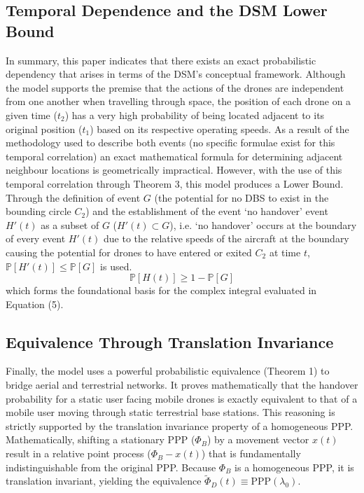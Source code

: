 \documentclass[12pt,a4paper]{article}
\begin{document}
   \subsection*{Temporal Dependence and the DSM Lower Bound} %
In summary, this paper indicates that there exists an exact probabilistic dependency that arises in terms of the DSM's conceptual framework.    %
Although the model supports the premise that the actions of the drones are independent from one another when travelling through space, the position of each drone on a given time ($t_2$) has a very high probability of being located adjacent to its original position ($t_1$) based on its respective operating speeds.    %
As a result of the methodology used to describe both events (no specific formulae exist for this temporal correlation) an exact mathematical formula for determining adjacent neighbour locations is geometrically impractical.    %
However, with the use of this temporal correlation through Theorem 3, this model produces a Lower Bound.    %
Through the definition of event $G$ (the potential for no DBS to exist in the bounding circle $C_2$) and the establishment of the event ‘no handover’ event $H'(t)$ as a subset of $G$ ($H'(t) \subset G$), i.e. ‘no handover’ occurs at the boundary of every event $H'(t)$ due to the relative speeds of the aircraft at the boundary causing the potential for drones to have entered or exited $C_2$ at time $t$, $\mathbb{P}[H'(t)] \leq \mathbb{P}[G]$ is used.    %
   $$\mathbb{P}[H(t)] \geq 1 - \mathbb{P}[G]$$ %
which forms the foundational basis for the complex integral evaluated in Equation (5).    %

   \subsection*{Equivalence Through Translation Invariance} %
Finally, the model uses a powerful probabilistic equivalence (Theorem 1) to bridge aerial and terrestrial networks.    %
It proves mathematically that the handover probability for a static user facing mobile drones is exactly equivalent to that of a mobile user moving through static terrestrial base stations.    %
This reasoning is strictly supported by the translation invariance property of a homogeneous PPP.    %
Mathematically, shifting a stationary PPP ($\Phi_B$) by a movement vector $x(t)$ result in a relative point process ($\Phi_B - x(t)$) that is fundamentally indistinguishable from the original PPP.    %
Because $\Phi_B$ is a homogeneous PPP, it is translation invariant, yielding the equivalence $\tilde{\Phi}_D(t) \equiv \text{PPP}(\lambda_0)$.    %
\end{document}
